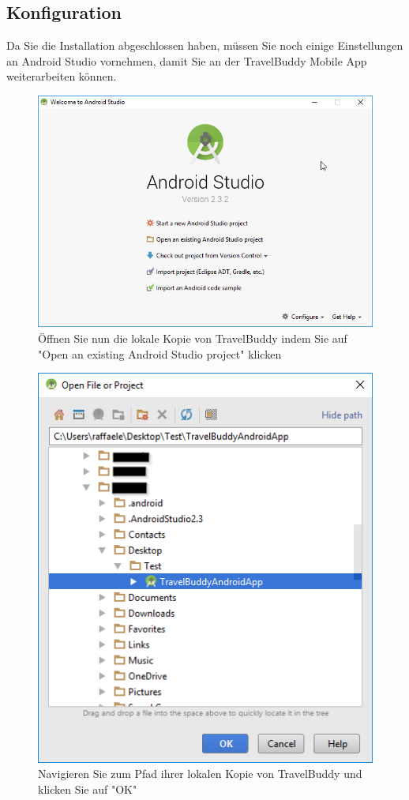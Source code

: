 \documentclass[a4paper,10pt,xetex]{article}
\begin{document}
\subsection{Konfiguration}

Da Sie die Installation abgeschlossen haben, müssen Sie noch einige Einstellungen an Android Studio vornehmen, damit Sie an der TravelBuddy Mobile App weiterarbeiten können.

\begin{figure}
  \centering
  \includegraphics[width=\textwidth]{Installation/2-1}
  \caption{Öffnen Sie nun die lokale Kopie von TravelBuddy indem Sie auf "Open an existing Android Studio project" klicken}
\end{figure}

\begin{figure}
  \centering
  \includegraphics[width=\textwidth]{Installation/2-2}
  \caption{Navigieren Sie zum Pfad ihrer lokalen Kopie von TravelBuddy und klicken Sie auf "OK"}
\end{figure}
\end{document}
